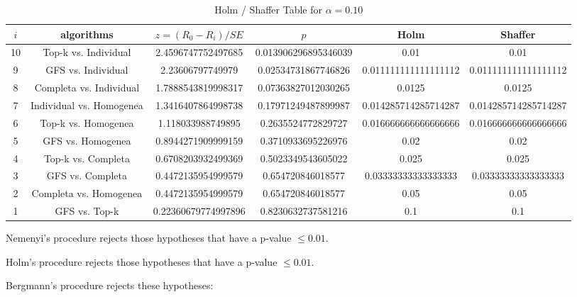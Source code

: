 \documentclass[a4paper,10pt]{article}
\begin{document}
\begin{landscape}
\begin{table}[!htp]
\centering\tiny
\caption{Holm / Shaffer Table for $\alpha=0.10$}
\begin{tabular}{cccccc}
$i$&algorithms&$z=(R_0 - R_i)/SE$&$p$&Holm&Shaffer\\
\hline
10&Top-k vs. Individual&2.4596747752497685&0.013906296895346039&0.01&0.01\\
9&GFS vs. Individual&2.23606797749979&0.02534731867746826&0.011111111111111112&0.011111111111111112\\
8&Completa vs. Individual&1.7888543819998317&0.07363827012030265&0.0125&0.0125\\
7&Individual vs. Homogenea&1.3416407864998738&0.17971249487899987&0.014285714285714287&0.014285714285714287\\
6&Top-k vs. Homogenea&1.118033988749895&0.2635524772829727&0.016666666666666666&0.016666666666666666\\
5&GFS vs. Homogenea&0.8944271909999159&0.3710933695226976&0.02&0.02\\
4&Top-k vs. Completa&0.6708203932499369&0.5023349543605022&0.025&0.025\\
3&GFS vs. Completa&0.4472135954999579&0.654720846018577&0.03333333333333333&0.03333333333333333\\
2&Completa vs. Homogenea&0.4472135954999579&0.654720846018577&0.05&0.05\\
1&GFS vs. Top-k&0.22360679774997896&0.8230632737581216&0.1&0.1\\
\hline
\end{tabular}
\end{table}
Nemenyi's procedure rejects those hypotheses that have a p-value $\le0.01$.


Holm's procedure rejects those hypotheses that have a p-value $\le0.01$.


Bergmann's procedure rejects these hypotheses:


\begin{itemize}


\end{itemize}



\end{landscape}
\end{document}
